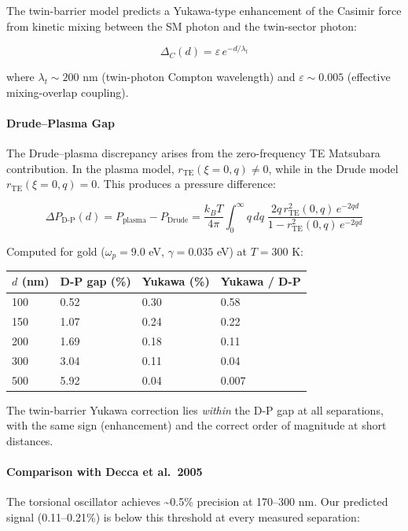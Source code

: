 \documentclass[
  11pt,
]{article}
\begin{document}
The twin-barrier model predicts a Yukawa-type enhancement of the Casimir
force from kinetic mixing between the SM photon and the twin-sector
photon:

\[\Delta_C(d) = \varepsilon \, e^{-d/\lambda_t} \tag{170}\]

where \(\lambda_t \sim 200\) nm (twin-photon Compton wavelength) and
\(\varepsilon \sim 0.005\) (effective mixing-overlap coupling).

\bigskip

\hypertarget{drudeplasma-gap}{%
\paragraph{Drude--Plasma Gap}\label{drudeplasma-gap}}

The Drude--plasma discrepancy arises from the zero-frequency TE
Matsubara contribution. In the plasma model,
\(r_{\text{TE}}(\xi=0, q) \neq 0\), while in the Drude model
\(r_{\text{TE}}(\xi=0, q) = 0\). This produces a pressure difference:

\[\Delta P_{\text{D-P}}(d) = P_{\text{plasma}} - P_{\text{Drude}} = \frac{k_B T}{4\pi} \int_0^\infty q \, dq \; \frac{2q \, r_{\text{TE}}^2(0,q) \, e^{-2qd}}{1 - r_{\text{TE}}^2(0,q) \, e^{-2qd}} \tag{171}\]

Computed for gold (\(\omega_p = 9.0\) eV, \(\gamma = 0.035\) eV) at
\(T = 300\) K:

\begin{longtable}[]{@{}llll@{}}
\toprule
\(d\) (nm) & D-P gap (\%) & Yukawa (\%) & Yukawa / D-P\tabularnewline
\midrule
\endhead
100 & 0.52 & 0.30 & 0.58\tabularnewline
150 & 1.07 & 0.24 & 0.22\tabularnewline
200 & 1.69 & 0.18 & 0.11\tabularnewline
300 & 3.04 & 0.11 & 0.04\tabularnewline
500 & 5.92 & 0.04 & 0.007\tabularnewline
\bottomrule
\end{longtable}

The twin-barrier Yukawa correction lies \emph{within} the D-P gap at all
separations, with the same sign (enhancement) and the correct order of
magnitude at short distances.

\bigskip

\hypertarget{comparison-with-decca-et-al.-2005}{%
\paragraph{Comparison with Decca et
al.~2005}\label{comparison-with-decca-et-al.-2005}}

The torsional oscillator achieves \textasciitilde0.5\% precision at
170--300 nm. Our predicted signal (0.11--0.21\%) is below this threshold
at every measured separation:
\end{document}
